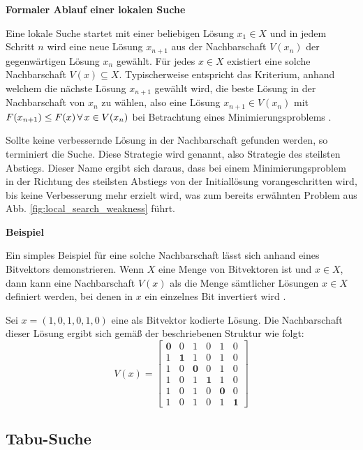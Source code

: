 \textbf{Formaler Ablauf einer lokalen Suche}

Eine lokale Suche startet mit einer beliebigen Lösung $x_1 \in X$ und in jedem Schritt $n$
wird eine neue Lösung $x_{n+1}$ aus der Nachbarschaft $V(x_n)$ der gegenwärtigen Lösung $x_n$ gewählt.
Für jedes $x \in X$ existiert eine solche Nachbarschaft $V(x) \subseteq X$.
Typischerweise entspricht das Kriterium, anhand welchem die nächste Lösung $x_{n+1}$ gewählt wird,
die beste Lösung in der Nachbarschaft von $x_n$ zu wählen, also eine Lösung $x_{n+1} \in V(x_n)$
mit $F(x_{n+1}) \leq F(x) \thinspace \forall \thinspace x \in V(x_n)$ bei Betrachtung eines
Minimierungsproblems \cite{Pirlot1996}.

Sollte keine verbessernde Lösung in der Nachbarschaft gefunden werden, so terminiert die Suche.
Diese Strategie wird  genannt, also Strategie des steilsten Abstiegs.
Dieser Name ergibt sich daraus, dass bei einem Minimierungsproblem in der Richtung des steilsten Abstiegs
von der Initiallösung vorangeschritten wird, bis keine Verbesserung mehr erzielt wird,
was zum bereits erwähnten Problem aus Abb. \ref{fig:local_search_weakness} führt.\newline

\textbf{Beispiel}

Ein simples Beispiel für eine solche Nachbarschaft lässt sich anhand eines Bitvektors demonstrieren.
Wenn $X$ eine Menge von Bitvektoren ist und $x \in X$, dann kann eine Nachbarschaft $V(x)$ als die Menge
sämtlicher Lösungen $x \in X$ definiert werden, bei denen in $x$ ein einzelnes Bit invertiert wird \cite{Pirlot1996}.

Sei $x = (1, 0, 1, 0, 1, 0)$ eine als Bitvektor kodierte Lösung.
Die Nachbarschaft dieser Lösung ergibt sich gemäß der beschriebenen Struktur wie folgt:
\[
V(x) =
  \begin{bmatrix}
    \boldsymbol{0} & 0 & 1 & 0 & 1 & 0 \\
    1 & \boldsymbol{1} & 1 & 0 & 1 & 0 \\
    1 & 0 & \boldsymbol{0} & 0 & 1 & 0 \\
    1 & 0 & 1 & \boldsymbol{1} & 1 & 0 \\
    1 & 0 & 1 & 0 & \boldsymbol{0} & 0 \\
    1 & 0 & 1 & 0 & 1 & \boldsymbol{1}
  \end{bmatrix}
\]

\vfill
\pagebreak

\subsection{Tabu-Suche}
\label{sec:tabu_search}

